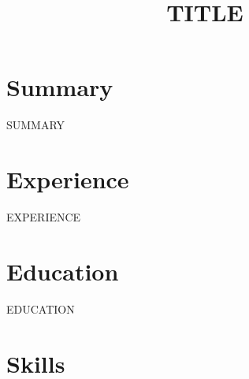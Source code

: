 \documentclass[10pt,a4paper,sans]{moderncv}
\title{ {{TITLE}} }
\begin{document}
\makecvtitle

\section{Summary}
{{SUMMARY}}

\section{Experience}
{{EXPERIENCE}}

\section{Education}
{{EDUCATION}}

\section{Skills}
\end{document}
